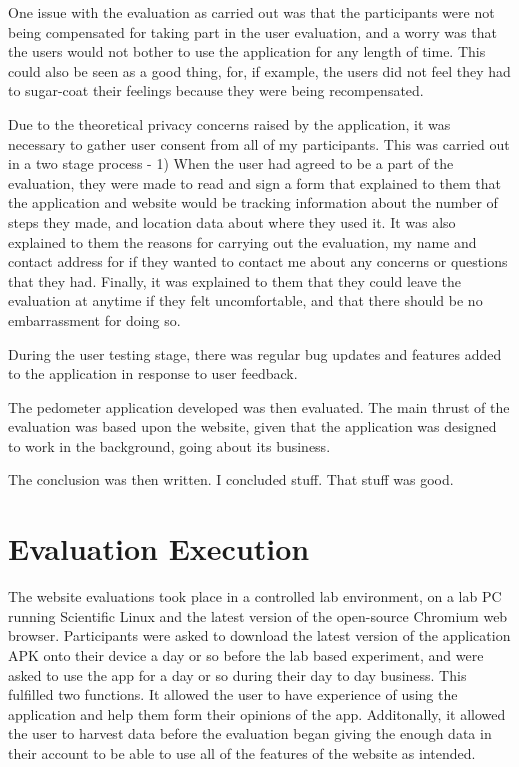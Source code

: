 \documentclass{l4proj}
\begin{document}
One issue with the evaluation as carried out was that the participants were not being compensated for taking part in the user evaluation, and a worry was that the users would not bother to use the application for any length of time. This could also be seen as a good thing, for, if example, the users did not feel they had to sugar-coat their feelings because they were being recompensated.
 
Due to the theoretical privacy concerns raised by the application, it was necessary to gather user consent from all of my participants. This was carried out in a two stage process - 1) When the user had agreed to be a part of the evaluation, they were made to read and sign a form that explained to them that the application and website would be tracking information about the number of steps they made, and location data about where they used it. It was also explained to them the reasons for carrying out the evaluation, my name and contact address for if they wanted to contact me about any concerns or questions that they had. Finally, it was explained to them that they could leave the evaluation at anytime if they felt uncomfortable, and that there should be no embarrassment for doing so.

During the user testing stage, there was regular bug updates and features added to the application in response to user feedback.

The pedometer application developed was then evaluated. The main thrust of the evaluation was based upon the website, given that the application was designed to work in the background, going about its business.

The conclusion was then written. I concluded stuff. That stuff was good.

\section{Evaluation Execution}

The website evaluations took place in a controlled lab environment, on a lab PC running Scientific Linux and the latest version of the open-source Chromium web browser. Participants were asked to download the latest version of the application APK onto their device a day or so before the lab based experiment, and were asked to use the app for a day or so during their day to day business. This fulfilled two functions. It allowed the user to have experience of using the application and help them form their opinions of the app. Additonally, it allowed the user to harvest data before the evaluation began giving the enough data in their account to be able to use all of the features of the website as intended.
\end{document}
